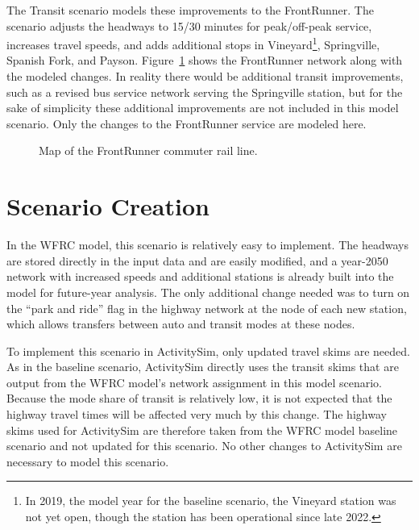 \documentclass[fancy, twoside, mastersfancy, ms]{byuthesis}
\begin{document}
The Transit scenario models these improvements to the FrontRunner. The
scenario adjusts the headways to 15/30 minutes for peak/off-peak
service, increases travel speeds, and adds additional stops in
Vineyard\footnote{In 2019, the model year for the baseline scenario, the
  Vineyard station was not yet open, though the station has been
  operational since late 2022.}, Springville, Spanish Fork, and Payson.
Figure~\ref{fig-frontrunner-map} shows the FrontRunner network along
with the modeled changes. In reality there would be additional transit
improvements, such as a revised bus service network serving the
Springville station, but for the sake of simplicity these additional
improvements are not included in this model scenario. Only the changes
to the FrontRunner service are modeled here.

\begin{figure}[p]


\caption{\label{fig-frontrunner-map}Map of the FrontRunner commuter rail
line.}

\end{figure}%

\section{Scenario Creation}\label{scenario-creation-1}

In the WFRC model, this scenario is relatively easy to implement. The
headways are stored directly in the input data and are easily modified,
and a year-2050 network with increased speeds and additional stations is
already built into the model for future-year analysis. The only
additional change needed was to turn on the ``park and ride'' flag in
the highway network at the node of each new station, which allows
transfers between auto and transit modes at these nodes.

To implement this scenario in ActivitySim, only updated travel skims are
needed. As in the baseline scenario, ActivitySim directly uses the
transit skims that are output from the WFRC model's network assignment
in this model scenario. Because the mode share of transit is relatively
low, it is not expected that the highway travel times will be affected
very much by this change. The highway skims used for ActivitySim are
therefore taken from the WFRC model baseline scenario and not updated
for this scenario. No other changes to ActivitySim are necessary to
model this scenario.
\end{document}
